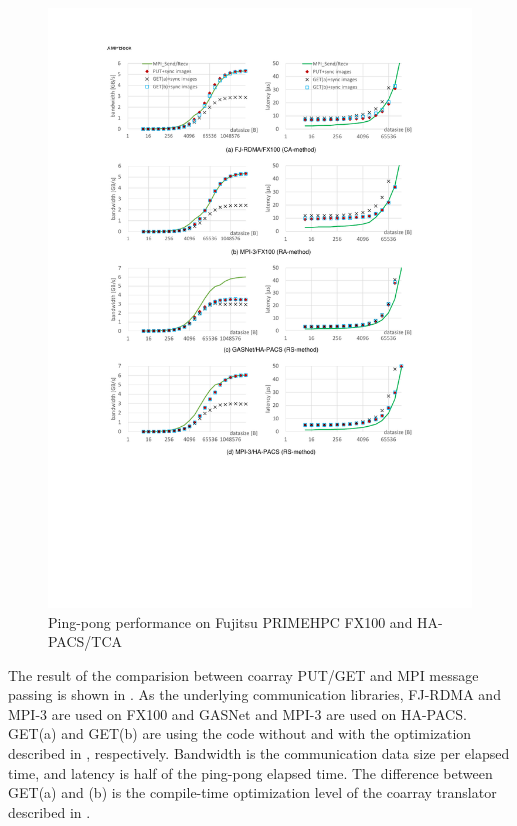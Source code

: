 
\begin{figure}[p]
  \begin{center}
    \mbox{\includegraphics[trim=30mm 70mm 30mm 23mm, scale=0.78, clip]{graphs/8graphs-8.pdf}}
    \caption{Ping-pong performance on Fujitsu PRIMEHPC FX100 and HA-PACS/TCA}\label{fig:8graphs}
  \end{center}
\end{figure}

The result of the comparision between coarray PUT/GET and MPI message passing is shown in
.
As the underlying communication libraries, 
FJ-RDMA and MPI-3 are used on FX100 and GASNet and MPI-3 are used on HA-PACS.
GET(a) and GET(b) are using the code without and with the optimization described in
, respectively.
Bandwidth is the communication data size per elapsed time, and
latency is half of the ping-pong elapsed time.
The difference between GET(a) and (b) is the compile-time optimization level of the 
coarray translator described in .

